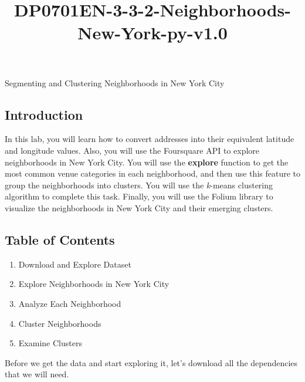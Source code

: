 \documentclass[11pt]{article}
\title{DP0701EN-3-3-2-Neighborhoods-New-York-py-v1.0}
\begin{document}
    
    
    \maketitle
    
    

    
    Segmenting and Clustering Neighborhoods in New York City

    \subsection{Introduction}\label{introduction}

In this lab, you will learn how to convert addresses into their
equivalent latitude and longitude values. Also, you will use the
Foursquare API to explore neighborhoods in New York City. You will use
the \textbf{explore} function to get the most common venue categories in
each neighborhood, and then use this feature to group the neighborhoods
into clusters. You will use the \emph{k}-means clustering algorithm to
complete this task. Finally, you will use the Folium library to
visualize the neighborhoods in New York City and their emerging
clusters.

    \subsection{Table of Contents}\label{table-of-contents}

\begin{enumerate}
\def\labelenumi{\arabic{enumi}.}
\item
  Download and Explore Dataset
\item
  Explore Neighborhoods in New York City
\item
  Analyze Each Neighborhood
\item
  Cluster Neighborhoods
\item
  Examine Clusters\\
\end{enumerate}

    Before we get the data and start exploring it, let's download all the
dependencies that we will need.
\end{document}
